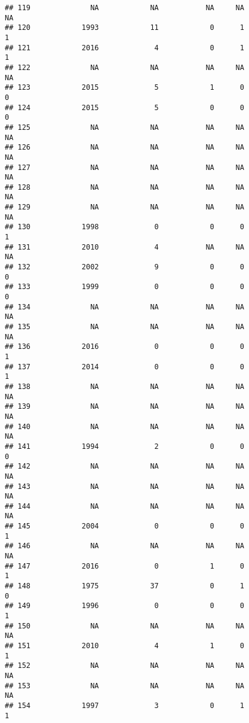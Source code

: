 \documentclass[
  english,
  man]{apa6}
\begin{document}
\begin{verbatim}
## 119              NA            NA           NA     NA              NA
## 120            1993            11            0      1               1
## 121            2016             4            0      1               1
## 122              NA            NA           NA     NA              NA
## 123            2015             5            1      0               0
## 124            2015             5            0      0               0
## 125              NA            NA           NA     NA              NA
## 126              NA            NA           NA     NA              NA
## 127              NA            NA           NA     NA              NA
## 128              NA            NA           NA     NA              NA
## 129              NA            NA           NA     NA              NA
## 130            1998             0            0      0               1
## 131            2010             4           NA     NA              NA
## 132            2002             9            0      0               0
## 133            1999             0            0      0               0
## 134              NA            NA           NA     NA              NA
## 135              NA            NA           NA     NA              NA
## 136            2016             0            0      0               1
## 137            2014             0            0      0               1
## 138              NA            NA           NA     NA              NA
## 139              NA            NA           NA     NA              NA
## 140              NA            NA           NA     NA              NA
## 141            1994             2            0      0               0
## 142              NA            NA           NA     NA              NA
## 143              NA            NA           NA     NA              NA
## 144              NA            NA           NA     NA              NA
## 145            2004             0            0      0               1
## 146              NA            NA           NA     NA              NA
## 147            2016             0            1      0               1
## 148            1975            37            0      1               0
## 149            1996             0            0      0               1
## 150              NA            NA           NA     NA              NA
## 151            2010             4            1      0               1
## 152              NA            NA           NA     NA              NA
## 153              NA            NA           NA     NA              NA
## 154            1997             3            0      1               1

\end{verbatim}
\end{document}
